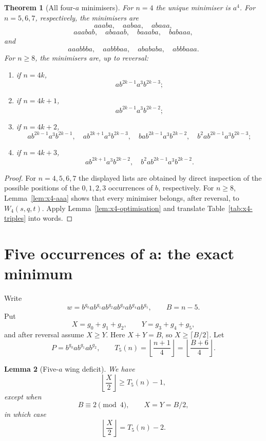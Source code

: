 \documentclass[11pt]{article}
\newtheorem{theorem}{Theorem}[section]
\newtheorem{lemma}[theorem]{Lemma}
\theoremstyle{definition}
\begin{document}
\begin{theorem}[All four-$a$ minimisers]\label{thm:x4-classification}
For $n=4$ the unique minimiser is $a^4$. For $n=5,6,7$, respectively, the minimisers are
\[
 aaaba,\quad aabaa,\quad abaaa,
\]
\[
 aaabab,\quad abaaab,\quad baaaba,\quad babaaa,
\]
and
\[
 aaabbba,\quad aabbbaa,\quad abababa,\quad abbbaaa.
\]
For $n\ge8$, the minimisers are, up to reversal:
\begin{enumerate}[label=\textup{(\roman*)}]
\item if $n=4k$,
\[
 ab^{2k-1}a^3b^{2k-3};
\]
\item if $n=4k+1$,
\[
 ab^{2k-1}a^3b^{2k-2};
\]
\item if $n=4k+2$,
\[
 ab^{2k-1}a^3b^{2k-1},\quad
 ab^{2k+1}a^3b^{2k-3},\quad
 bab^{2k-1}a^3b^{2k-2},\quad
 b^2ab^{2k-1}a^3b^{2k-3};
\]
\item if $n=4k+3$,
\[
 ab^{2k+1}a^3b^{2k-2},\quad
 b^2ab^{2k-1}a^3b^{2k-2}.
\]
\end{enumerate}
\end{theorem}

\begin{proof}
For $n=4,5,6,7$ the displayed lists are obtained by direct inspection of the possible positions of the $0,1,2,3$ occurrences of $b$, respectively. For $n\ge8$, Lemma~\ref{lem:x4-aaa} shows that every minimiser belongs, after reversal, to $W_4(s,q,t)$. Apply Lemma~\ref{lem:x4-optimisation} and translate Table~\ref{tab:x4-triples} into words.
\end{proof}

\section{Five occurrences of a: the exact minimum}

Write
\begin{equation}\label{eq:x5-gaps}
 w=b^{g_0}a b^{g_1}a b^{g_2}a b^{g_3}a b^{g_4}a b^{g_5},
 \qquad B=n-5.
\end{equation}
Put
\[
 X=g_0+g_1+g_2,\qquad Y=g_3+g_4+g_5,
\]
and after reversal assume $X\ge Y$. Here $X+Y=B$, so $X\ge\lceil B/2\rceil$. Let
\[
 P=b^{g_0}a b^{g_1}a b^{g_2},
\qquad
 T_5(n)=\left\lfloor\frac{n+1}{4}\right\rfloor
       =\left\lfloor\frac{B+6}{4}\right\rfloor.
\]

\begin{lemma}[Five-$a$ wing deficit]\label{lem:x5-deficit}
We have
\[
 \left\lfloor\frac X2\right\rfloor\ge T_5(n)-1,
\]
except when
\[
 B\equiv2\pmod4,\qquad X=Y=B/2,
\]
in which case
\[
 \left\lfloor\frac X2\right\rfloor=T_5(n)-2.
\]
\end{lemma}
\end{document}
